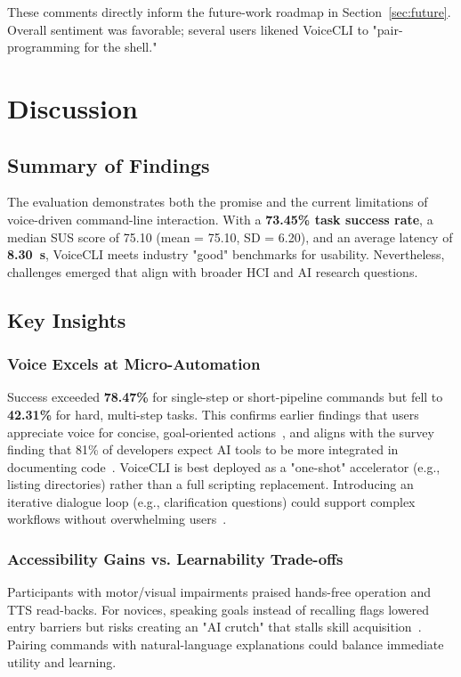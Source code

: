 \documentclass[a4paper,12pt]{article}
\begin{document}
These comments directly inform the future-work roadmap in Section~\ref{sec:future}. Overall sentiment was favorable; several users likened VoiceCLI to "pair-programming for the shell."






\newpage  
\section{Discussion}

\subsection{Summary of Findings}
The evaluation demonstrates both the promise and the current limitations of voice-driven command-line interaction. With a \textbf{73.45\% task success rate}, a median SUS score of 75.10 (mean = 75.10, SD = 6.20), and an average latency of \textbf{8.30~s}, VoiceCLI meets industry "good" benchmarks for usability. Nevertheless, challenges emerged that align with broader HCI and AI research questions.

\subsection{Key Insights}

\subsubsection*{Voice Excels at Micro-Automation}  
Success exceeded \textbf{78.47\%} for single-step or short-pipeline commands but fell to \textbf{42.31\%} for hard, multi-step tasks. This confirms earlier findings that users appreciate voice for concise, goal-oriented actions~\cite{ref4}, and aligns with the survey finding that 81\% of developers expect AI tools to be more integrated in documenting code~\cite{ref2}. VoiceCLI is best deployed as a "one-shot" accelerator (e.g., listing directories) rather than a full scripting replacement. Introducing an iterative dialogue loop (e.g., clarification questions) could support complex workflows without overwhelming users~\cite{ref12}.  

\subsubsection*{Accessibility Gains vs. Learnability Trade-offs}  
Participants with motor/visual impairments praised hands-free operation and TTS read-backs. For novices, speaking goals instead of recalling flags lowered entry barriers but risks creating an "AI crutch" that stalls skill acquisition~\cite{ref5,ref4}. Pairing commands with natural-language explanations could balance immediate utility and learning.  
\end{document}
